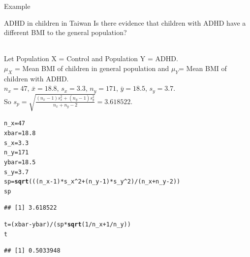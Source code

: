 \documentclass[t,xcolor=pdftex,dvipsnames,table]{beamer}\usepackage[]{graphicx}\usepackage[]{color}
\makeatletter
\newcommand{\hlnum}[1]{\textcolor[rgb]{0.686,0.059,0.569}{#1}}%
\newcommand{\hlopt}[1]{\textcolor[rgb]{0,0,0}{#1}}%
\newcommand{\hlstd}[1]{\textcolor[rgb]{0.345,0.345,0.345}{#1}}%
\newcommand{\hlkwb}[1]{\textcolor[rgb]{0.69,0.353,0.396}{#1}}%
\newcommand{\hlkwd}[1]{\textcolor[rgb]{0.737,0.353,0.396}{\textbf{#1}}}%
\newenvironment{kframe}{%
 \def\at@end@of@kframe{}%
 \ifinner\ifhmode%
  \def\at@end@of@kframe{\end{minipage}}%
  \begin{minipage}{\columnwidth}%
 \fi\fi%
 \def\FrameCommand##1{\hskip\@totalleftmargin \hskip-\fboxsep
 \colorbox{shadecolor}{##1}\hskip-\fboxsep
     \hskip-\linewidth \hskip-\@totalleftmargin \hskip\columnwidth}%
 \MakeFramed {\advance\hsize-\width
   \@totalleftmargin\z@ \linewidth\hsize
   \@setminipage}}%
 {\par\unskip\endMakeFramed%
 \at@end@of@kframe}
\newenvironment{knitrout}{}{} %
\makeatother
\begin{document}
\begin{frame}[fragile]{Example}

\begin{block}{ADHD in children in Taiwan}
Is there evidence that children with ADHD have a different BMI to the general population?
\end{block}

\vspace{.5cm}
  \\
Let Population X = Control and Population Y = ADHD. \\
$\mu_{X}$ = Mean BMI of children in general population and $\mu_{Y}$= Mean BMI of children with ADHD. \\
$n_{x} = 47$, $\bar{x} = 18.8$, $s_{x} = 3.3$, $n_{y} = 171$, $\bar{y} = 18.5$, $s_{y} = 3.7$. \\
So $s_{p} = \sqrt{  \frac{ (n_{x}-1) s_{x}^2 +  (n_{y}-1) s_{y}^2 }{n_{x} + n_{y} -2}  } = 3.618522$.

\end{frame}



\begin{frame}[fragile]{}

\begin{knitrout}
\color{fgcolor}\begin{kframe}
\begin{alltt}
\hlstd{n_x}\hlkwb{=} \hlnum{47}
\hlstd{xbar}\hlkwb{=}\hlnum{18.8}
\hlstd{s_x}\hlkwb{=}\hlnum{3.3}
\hlstd{n_y}\hlkwb{=}\hlnum{171}
\hlstd{ybar}\hlkwb{=}\hlnum{18.5}
\hlstd{s_y}\hlkwb{=}\hlnum{3.7}
\hlstd{sp} \hlkwb{=} \hlkwd{sqrt}\hlstd{( ((n_x}\hlopt{-}\hlnum{1}\hlstd{)}\hlopt{*}\hlstd{s_x}\hlopt{^}\hlnum{2} \hlopt{+} \hlstd{(n_y}\hlopt{-}\hlnum{1}\hlstd{)}\hlopt{*}\hlstd{s_y}\hlopt{^}\hlnum{2}\hlstd{)}\hlopt{/}\hlstd{(n_x}\hlopt{+}\hlstd{n_y}\hlopt{-}\hlnum{2}\hlstd{) )}
\hlstd{sp}
\end{alltt}
\begin{verbatim}
## [1] 3.618522
\end{verbatim}
\begin{alltt}
\hlstd{t} \hlkwb{=} \hlstd{(xbar}\hlopt{-}\hlstd{ybar)}\hlopt{/}\hlstd{(sp}\hlopt{*}\hlkwd{sqrt}\hlstd{(}\hlnum{1}\hlopt{/}\hlstd{n_x} \hlopt{+} \hlnum{1}\hlopt{/}\hlstd{n_y))}
\hlstd{t}
\end{alltt}
\begin{verbatim}
## [1] 0.5033948
\end{verbatim}
\end{kframe}
\end{knitrout}
\end{frame}  
\end{document}
